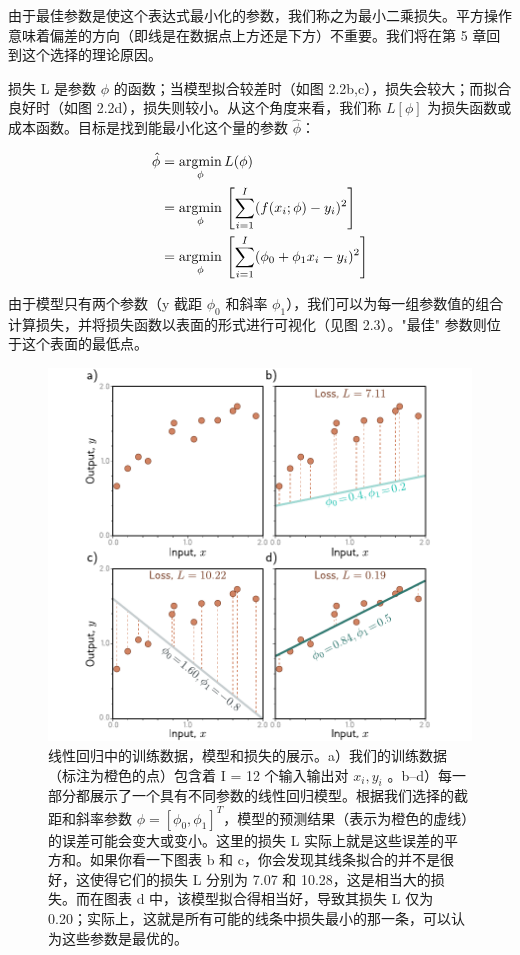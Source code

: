 \documentclass[lang=cn,newtx,10pt,scheme=chinese]{elegantbook}
\begin{document}
由于最佳参数是使这个表达式最小化的参数，我们称之为最小二乘损失。平方操作意味着偏差的方向（即线是在数据点上方还是下方）不重要。我们将在第 5 章回到这个选择的理论原因。

损失 L 是参数 $\phi$ 的函数；当模型拟合较差时（如图 2.2b,c），损失会较大；而拟合良好时（如图 2.2d），损失则较小。从这个角度来看，我们称 $L[\phi]$ 为损失函数或成本函数。目标是找到能最小化这个量的参数 $\hat \phi$：


\begin{align}
	\hat{\phi} &= \underset{\phi}{\mathrm{argmin}} \, L(\phi) \notag \\ 
	&= \underset{\phi}{\mathrm{argmin}} \, \left[ \sum_{i=1}^{I} (f(x_i; \phi) - y_i)^2 \right] \notag \\ 
	&= \underset{\phi}{\mathrm{argmin}} \, \left[ \sum_{i=1}^{I} (\phi_0 + \phi_1 x_i - y_i)^2 \right]  
\end{align} 


由于模型只有两个参数（y 截距 $\phi_0$ 和斜率 $\phi_1$），我们可以为每一组参数值的组合计算损失，并将损失函数以表面的形式进行可视化（见图 2.3）。"最佳" 参数则位于这个表面的最低点。

\begin{figure}
	\centering
	\includegraphics[width=0.7\linewidth]{PDFFigures/UDLChap2PDF/SupervisedLinearFitError.pdf}
	\caption{线性回归中的训练数据，模型和损失的展示。a）我们的训练数据（标注为橙色的点）包含着 I = 12 个输入输出对 {$x_i , y_i$ }。b–d）每一部分都展示了一个具有不同参数的线性回归模型。根据我们选择的截距和斜率参数 $\phi = [\phi_0 , \phi_1 ]^T$，模型的预测结果（表示为橙色的虚线）的误差可能会变大或变小。这里的损失 L 实际上就是这些误差的平方和。如果你看一下图表 b 和 c，你会发现其线条拟合的并不是很好，这使得它们的损失 L 分别为 7.07 和 10.28，这是相当大的损失。而在图表 d 中，该模型拟合得相当好，导致其损失 L 仅为 0.20；实际上，这就是所有可能的线条中损失最小的那一条，可以认为这些参数是最优的。}

\end{figure}
\end{document}
